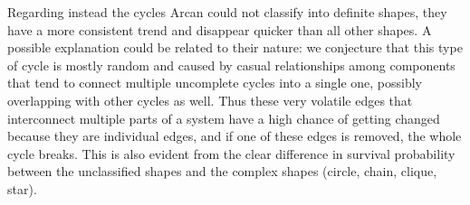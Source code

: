 Regarding instead the cycles Arcan could not classify into definite shapes, they have a more consistent trend and disappear quicker than all other shapes.
A possible explanation could be related to their nature: we conjecture that this type of cycle is mostly random and caused by casual relationships among components that tend to connect multiple uncomplete cycles into a single one, possibly overlapping with other cycles as well.
Thus these very volatile edges that interconnect multiple parts of a system have a high chance of getting changed because they are individual edges, and if one of these edges is removed, the whole cycle breaks.
This is also evident from the clear difference in survival probability between the unclassified shapes and the complex shapes (circle, chain, clique, star).




